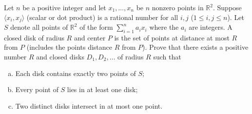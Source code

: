 Let $n$ be a positive integer and let $x_1, \dots, x_n$ be $n$ nonzero points
in $\mathbb{R}^2$. Suppose $\langle x_i, x_j \rangle$ (scalar or dot product)
is a rational number for all $i, j$ ($1 \le i, j \le n$). Let $S$ denote all
points of $\mathbb{R}^2$ of the form $\sum_{i=1}^n a_i x_i$ where the $a_i$ are
integers. A closed disk of radius $R$ and center $P$ is the set of points at
distance at most $R$ from $P$ (includes the points distance $R$ from $P$).
Prove that there exists a positive number $R$ and closed disks $D_1, D_2,
\dots$ of radius $R$ such that

\begin{enumerate}[(a)]
\item Each disk contains exactly two points of $S$;
\item Every point of $S$ lies in at least one disk;
\item Two distinct disks intersect in at most one point.
\end{enumerate}

